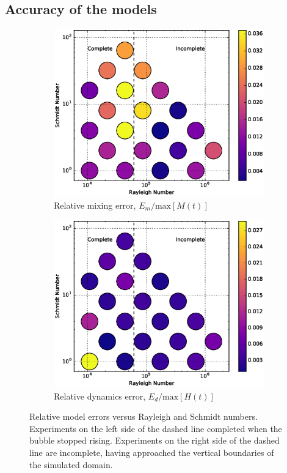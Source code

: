 \subsection{Accuracy of the models}

\begin{figure}
\begin{subfigure}[b]{0.5\textwidth}
\includegraphics[width=\textwidth]{figs/MixingError-vs-Rayleigh-Schmidt}
\caption{Relative mixing error, $E_m/\text{max}[M(t)]$}
\end{subfigure}
\begin{subfigure}[b]{0.5\textwidth}
\includegraphics[width=\textwidth]{figs/DynamicsError-vs-Rayleigh-Schmidt}
\caption{Relative dynamics error, $E_d/\text{max}[H(t)]$}
\end{subfigure}
\caption{ 
  Relative model errors versus Rayleigh and Schmidt numbers.
  Experiments on the left side of the dashed line completed when the bubble stopped rising.
  Experiments on the right side of the dashed line are incomplete, having approached the vertical boundaries of the simulated domain.
}
\end{figure}

